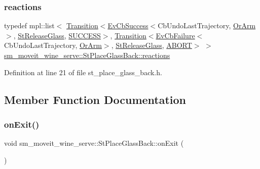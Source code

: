 \subsubsection{\texorpdfstring{reactions}{reactions}}
{\footnotesize\ttfamily typedef mpl\+::list$<$ \hyperlink{classsmacc_1_1Transition}{Transition}$<$\hyperlink{structsmacc_1_1EvCbSuccess}{Ev\+Cb\+Success}$<$Cb\+Undo\+Last\+Trajectory, \hyperlink{classsm__moveit__wine__serve_1_1OrArm}{Or\+Arm}$>$, \hyperlink{structsm__moveit__wine__serve_1_1StReleaseGlass}{St\+Release\+Glass}, \hyperlink{structsmacc_1_1default__transition__tags_1_1SUCCESS}{S\+U\+C\+C\+E\+SS}$>$, \hyperlink{classsmacc_1_1Transition}{Transition}$<$\hyperlink{structsmacc_1_1EvCbFailure}{Ev\+Cb\+Failure}$<$Cb\+Undo\+Last\+Trajectory, \hyperlink{classsm__moveit__wine__serve_1_1OrArm}{Or\+Arm}$>$, \hyperlink{structsm__moveit__wine__serve_1_1StReleaseGlass}{St\+Release\+Glass}, \hyperlink{structsmacc_1_1default__transition__tags_1_1ABORT}{A\+B\+O\+RT}$>$ $>$ \hyperlink{structsm__moveit__wine__serve_1_1StPlaceGlassBack_a12d89a7779d3053752cc5587c812fd1b}{sm\+\_\+moveit\+\_\+wine\+\_\+serve\+::\+St\+Place\+Glass\+Back\+::reactions}}



Definition at line 21 of file st\+\_\+place\+\_\+glass\+\_\+back.\+h.



\subsection{Member Function Documentation}
\mbox{\label{structsm__moveit__wine__serve_1_1StPlaceGlassBack_a49d2a83c443cfe5de54d90c94775f539}} 
\subsubsection{\texorpdfstring{on\+Exit()}{onExit()}}
{\footnotesize\ttfamily void sm\+\_\+moveit\+\_\+wine\+\_\+serve\+::\+St\+Place\+Glass\+Back\+::on\+Exit (\begin{DoxyParamCaption}{ }\end{DoxyParamCaption})\hspace{0.3cm}{\ttfamily [inline]}}



